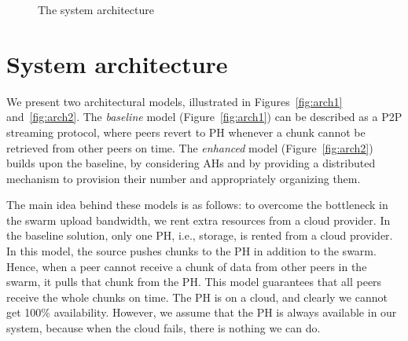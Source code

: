 \begin{figure}[t]
\centering
{}
\caption{\small The system architecture}\label{fig:arch}
\end{figure}


\section{System architecture} \label{sec:system}
We present two architectural models, illustrated
in Figures~\ref{fig:arch1} and~\ref{fig:arch2}. The \emph{baseline} model
(Figure~\ref{fig:arch1}) can be described as a P2P streaming protocol, where
peers revert to PH whenever a chunk cannot be retrieved from other peers on time. The
\emph{enhanced} model (Figure~\ref{fig:arch2}) builds upon the baseline, by
considering AHs and by providing a distributed mechanism to provision their
number and appropriately organizing them. 

The main idea behind these models is as follows: to overcome the bottleneck in the swarm upload bandwidth, we rent extra resources from a cloud provider. In the baseline solution, only one PH, i.e., storage, is rented from a cloud provider. In this model, the source pushes chunks to the PH in addition to the swarm. Hence, when a peer cannot receive a chunk of data from other peers in the swarm, it pulls that chunk from the PH. This model guarantees that all peers receive the whole chunks on time. The PH is on a cloud, and clearly we cannot get 100\% availability. However, we assume that the PH is always available in our system, because when the cloud fails, there is nothing we can do.

